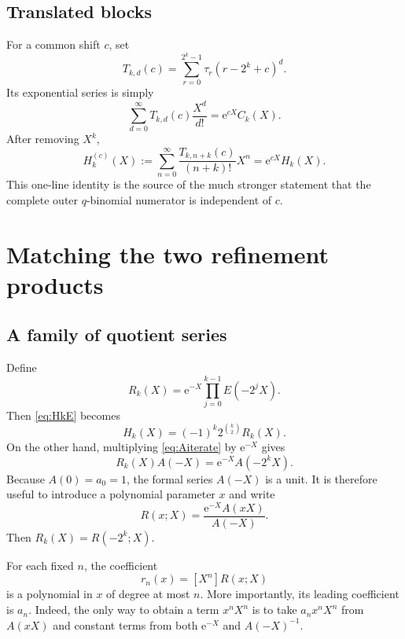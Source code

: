 \documentclass[11pt,oneside]{article}
\theoremstyle{definition}
\theoremstyle{remark}
\newcommand{\coeff}[2]{\left[#1^{#2}\right]}
\newcommand{\e}{\mathrm e}
\newcommand{\tm}{\tau}
\begin{document}
\subsection{Translated blocks}

For a common shift $c$, set
\begin{equation}\label{eq:Ttrans}
 T_{k,d}(c)=\sum_{r=0}^{2^k-1}\tm_r(r-2^k+c)^d.
\end{equation}
Its exponential series is simply
\begin{equation}\label{eq:Ctrans}
 \sum_{d=0}^{\infty}T_{k,d}(c)\frac{X^d}{d!}
 =\e^{cX}C_k(X).
\end{equation}
After removing $X^k$,
\begin{equation}\label{eq:Htrans}
 H_k^{(c)}(X)
 :=\sum_{n=0}^{\infty}\frac{T_{k,n+k}(c)}{(n+k)!}X^n
 =\e^{cX}H_k(X).
\end{equation}
This one-line identity is the source of the much stronger statement that the complete outer $q$-binomial numerator is independent of $c$.

\section{Matching the two refinement products}

\subsection{A family of quotient series}

Define
\begin{equation}\label{eq:Rkdef}
 R_k(X)=\e^{-X}\prod_{j=0}^{k-1}E(-2^jX).
\end{equation}
Then \eqref{eq:HkE} becomes
\begin{equation}\label{eq:HkRk}
 H_k(X)=(-1)^k2^{\binom{k}{2}}R_k(X).
\end{equation}
On the other hand, multiplying \eqref{eq:Aiterate} by $\e^{-X}$ gives
\begin{equation}\label{eq:RkA}
 \boxed{
 R_k(X)A(-X)=\e^{-X}A(-2^kX).}
\end{equation}
Because $A(0)=a_0=1$, the formal series $A(-X)$ is a unit.  It is therefore useful to introduce a polynomial parameter $x$ and write
\begin{equation}\label{eq:Rparam}
 R(x;X)=\frac{\e^{-X}A(xX)}{A(-X)}.
\end{equation}
Then $R_k(X)=R(-2^k;X)$.

For each fixed $n$, the coefficient
\begin{equation}\label{eq:rnpoly}
 r_n(x)=\coeff{X}{n}R(x;X)
\end{equation}
is a polynomial in $x$ of degree at most $n$.  More importantly, its leading coefficient is $a_n$.  Indeed, the only way to obtain a term $x^nX^n$ is to take $a_nx^nX^n$ from $A(xX)$ and constant terms from both $\e^{-X}$ and $A(-X)^{-1}$.
\end{document}
